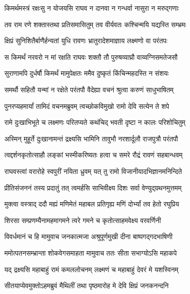 \twolineshloka
{किमर्थमस्त्रं रक्षःसु न योजयसि राघव}
{न दानवा न गन्धर्वा नासुरा न मरुद्गणाः} %

\twolineshloka
{तव राम रणे शक्तास्तथा प्रतिसमासितुम्}
{तव वीर्यवतः कश्चिन्मयि यद्यस्ति सम्भ्रमः} %

\twolineshloka
{क्षिप्रं सुनिशितैर्बाणैर्हन्यतां युधि रावणः}
{भ्रातुरादेशमाज्ञाय लक्ष्मणो वा परंतपः} %

\twolineshloka
{स किमर्थं नरवरो न मां रक्षति राघवः}
{शक्तौ तौ पुरुषव्याघ्रौ वाय्वग्निसमतेजसौ} %

\twolineshloka
{सुराणामपि दुर्धर्षौ किमर्थं मामुपेक्षतः}
{ममैव दुष्कृतं किंचिन्महदस्ति न संशयः} %

\twolineshloka
{समर्थौ सहितौ यन्मां न रक्षेते परंतपौ}
{वैदेह्या वचनं श्रुत्वा करुणं साधुभाषितम्} %

\twolineshloka
{पुनरप्यहमार्यां तामिदं वचनमब्रुवम्}
{त्वच्छोकविमुखो रामो देवि सत्येन ते शपे} %

\twolineshloka
{रामे दुःखाभिभूते च लक्ष्मणः परितप्यते}
{कथंचिद् भवती दृष्टा न कालः परिशोचितुम्} %

\twolineshloka
{अस्मिन् मुहूर्ते दुःखानामन्तं द्रक्ष्यसि भामिनि}
{तावुभौ नरशार्दूलौ राजपुत्रौ परंतपौ} %

\twolineshloka
{त्वद्दर्शनकृतोत्साहौ लङ्कां भस्मीकरिष्यतः}
{हत्वा च समरे रौद्रं रावणं सहबान्धवम्} %

\twolineshloka
{राघवस्त्वां वरारोहे स्वपुरीं नयिता ध्रुवम्}
{यत् तु रामो विजानीयादभिज्ञानमनिन्दिते} %

\twolineshloka
{प्रीतिसंजननं तस्य प्रदातुं तत् त्वमर्हसि}
{साभिवीक्ष्य दिशः सर्वा वेण्युद्ग्रथनमुत्तमम्} %

\twolineshloka
{मुक्त्वा वस्त्राद् ददौ मह्यं मणिमेतं महाबल}
{प्रतिगृह्य मणिं दोर्भ्यां तव हेतो रघुप्रिय} %

\twolineshloka
{शिरसा सम्प्रणम्यैनामहमागमने त्वरे}
{गमने च कृतोत्साहमवेक्ष्य वरवर्णिनी} %

\twolineshloka
{विवर्धमानं च हि मामुवाच जनकात्मजा}
{अश्रुपूर्णमुखी दीना बाष्पगद्गदभाषिणी} %

\twolineshloka
{ममोत्पतनसम्भ्रान्ता शोकवेगसमाहता}
{मामुवाच ततः सीता सभाग्योऽसि महाकपे} %

\twolineshloka
{यद् द्रक्ष्यसि महाबाहुं रामं कमललोचनम्}
{लक्ष्मणं च महाबाहुं देवरं मे यशस्विनम्} %

\twolineshloka
{सीतयाप्येवमुक्तोऽहमब्रुवं मैथिलीं तथा}
{पृष्ठमारोह मे देवि क्षिप्रं जनकनन्दनि} %

